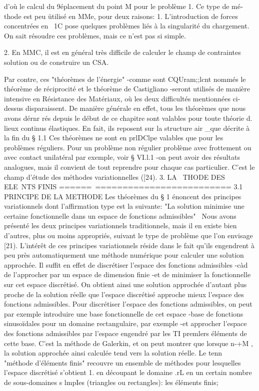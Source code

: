 d'où le calcul du 9éplacement du point M pour le problème 1. Ce type de mé­thode est peu ütilisé en MMe, pour deux raisons: 
1. 
L'introduction de forces concentrées en ~1C pose quelques problèmes liés à la singularité du chargement. On sait résoudre ces problèmes, mais ce n'est pas si simple. 

2. 
En MMC, il est en général très difficile de calculer le champ de contrain­tes solution ou de construire un CSA. 


Par contre, ces "théorèmes de l'énergie" -comme sont CQUram;;lcnt nommés le théorème de réciprocité et le théorème de Castigliano -seront utilisés de manière intensive en Résistance des Matériaux, où les deux dif­ficultés mentionnées ci-dessus disparaissent. De manière générale en effet, tous les théorèmes que nous avons dérnr rés depuis le début de ce chapitre 
sont valables pour toute théorie d. lieux continus élastiques. En fait, 
ils reposent sur la structure air _que décrite à la fin du § 1.1 
Ces théorèmes ne sont en prlDClpe valables que pour les problèmes réguliers. Pour un problème non régulier problème avec frottement ou avec contact unilatéral par exemple, voir § VI.l.1 -on peut avoir des résultats analogues, mais il convient de tout reprendre pour chaque cas particulier. C'est le champ d'étude des méthodes variationnelles ([24). 
3. LA ~THODE DES ELE~NTS FINIS 
======~========================= 
3.1 PRINCIPE DE LA METHODE 
Les théorèmes du § 1 énoncent des principes variationnels dont l'affirmation type est la suivante: "La solution minimise une certaine fonc­tionnelle dans un espace de fonctions admissibles"~ Nous avons présenté les deux principes variationnels traditionnels, mais il en existe bien d'autres, plus ou moins appropriés, suivant le type de problème que l'on envisage [21). L'intérêt de ces principes variationnels réside dans le fait qu'ils engen­drent à peu près automatiquement une méthode numérique pour calculer une so­lution approchée. Il suffit en effet de discrétiser l'espace des fonctions admissibles -càd de l'approcher par un espace de dimension finie -et de 
minimiser la fonctionnelle sur cet espace discrétisé. On obtient ainsi une 
solution approchée d'autant plus proche de la solution réelle que l'espace discrétisé approche mieux l'espace des fonctions admissibles. 
Pour discrétiser l'espace des fonctions admissibles, on peut par exemple introduire une base fonctionnelle de cet espace -base de fonctions sinusoïdales pour un domaine rectangulaire, par exemple -et approcher l'es­pace des fonctions admissibles par l'espace engendré par les TI premlers éléments de cette base. C'est la méthode de Galerkin, et on peut montrer que lorsque n-+M , la solution approchée ainsi calculée tend vers la solution réelle. 
Le tenn~ "méthode d'éléments finis" recouvre un ensemble de métho­des pour lesquelles l'espace discrétisé s'obtient 
1. 
en découpant le domaine .rL en un certain nombre de sous-domaines s lm­pIes (triangles ou rectangles): les éléments finis; 

